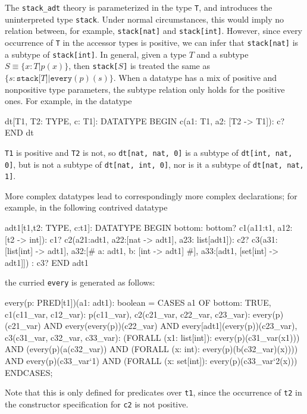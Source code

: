 The \texttt{stack\_adt} theory is parameterized in the type \texttt{T}, and
introduces the uninterpreted type \texttt{stack}.  Under normal
circumstances, this would imply no relation between, for example,
\texttt{stack[nat]} and \texttt{stack[int]}.  However, since every
occurrence of \texttt{T} in the accessor types is positive, we can infer
that \texttt{stack[nat]} is a subtype of \texttt{stack[int]}.  In general,
given a type $T$ and a subtype $S \equiv \{x:T | p(x)\}$, then
\texttt{stack[$S$]} is treated the same as
$\{s: \texttt{stack[}T\texttt{]} | \texttt{every}(p)(s)\}$.
When a datatype has a mix of positive and nonpositive type parameters, the
subtype relation only holds for the positive ones.  For example,
in the datatype
\begin{pvsex}
  dt[T1, T2: TYPE, c: T1]: DATATYPE
   BEGIN
    c(a1: T1, a2: [T2 -> T1]): c?
   END dt
\end{pvsex}
\texttt{T1} is positive and \texttt{T2} is not, so \texttt{dt[nat, nat,
0]} is a subtype of \texttt{dt[int, nat, 0]}, but is not a subtype of
\texttt{dt[nat, int, 0]}, nor is it a subtype of \texttt{dt[nat, nat, 1]}.

More complex datatypes lead to correspondingly more complex declarations;
for example, in the following contrived datatype
\begin{pvsex}
  adt1[t1,t2: TYPE, c:t1]: DATATYPE
   BEGIN
    bottom: bottom?
    c1(a11:t1, a12: [t2 -> int]): c1?
    c2(a21:adt1, a22:[nat -> adt1], a23: list[adt1]): c2?
    c3(a31:[list[int] -> adt1],
       a32:[# a: adt1, b: [int -> adt1] #],
       a33:[adt1, [set[int] -> adt1]]) : c3?
   END adt1
\end{pvsex}
the curried \texttt{every} is generated as follows:
\begin{pvsex}
  every(p: PRED[t1])(a1: adt1): boolean =
    CASES a1 OF
      bottom: TRUE,
      c1(c11_var, c12_var): p(c11_var),
      c2(c21_var, c22_var, c23_var):
          every(p)(c21_var)
              AND every(every(p))(c22_var)
                AND every[adt1](every(p))(c23_var),
      c3(c31_var, c32_var, c33_var):
          (FORALL (x1: list[int]): every(p)(c31_var(x1)))
              AND
            (every(p)(a(c32_var))
                 AND (FORALL (x: int): every(p)(b(c32_var)(x))))
                AND every(p)(c33_var`1)
                  AND
                (FORALL (x: set[int]):
                   every(p)(c33_var`2(x)))
      ENDCASES;
\end{pvsex}
Note that this is only defined for predicates over \texttt{t1}, since
the occurrence of \texttt{t2} in the constructor specification for
\texttt{c2} is not positive.

